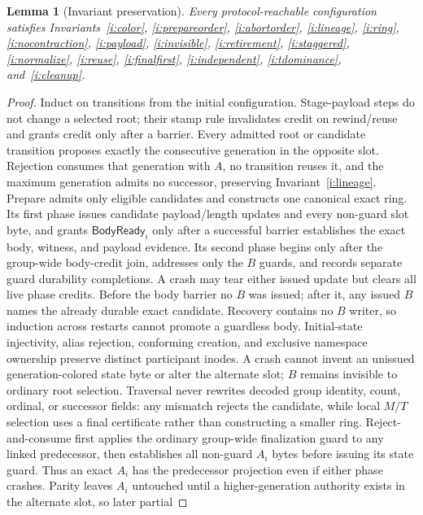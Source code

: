 \documentclass[10pt,twocolumn]{article}
\newtheorem{lemma}{Lemma}
\theoremstyle{remark}
\begin{document}
\begin{lemma}[Invariant preservation]\label{lem:preservation}
Every protocol-reachable configuration satisfies Invariants~\ref{i:color}, \ref{i:prepareorder}, \ref{i:abortorder},
  \ref{i:lineage}, \ref{i:ring}, \ref{i:nocontraction}, \ref{i:payload},
\ref{i:invisible}, \ref{i:retirement}, \ref{i:staggered}, \ref{i:normalize}, \ref{i:reuse},
\ref{i:finalfirst}, \ref{i:independent}, \ref{i:tdominance}, and~\ref{i:cleanup}.
\end{lemma}
\begin{proof}
Induct on transitions from the initial configuration. Stage-payload steps do not change a selected
root; their stamp rule invalidates credit on rewind/reuse and grants credit only after a barrier.
Every admitted root or candidate transition proposes exactly the consecutive generation in the
opposite slot. Rejection consumes that generation with $A$, no transition reuses it, and the maximum
generation admits no successor, preserving Invariant~\ref{i:lineage}.
Prepare admits only eligible candidates and constructs one canonical exact ring. Its first phase
issues candidate payload/length updates and every non-guard slot byte, and grants
$\mathsf{BodyReady}_i$ only after a successful barrier establishes the exact body, witness, and
payload evidence. Its second phase begins only after the group-wide body-credit join, addresses
only the $B$ guards, and records separate guard durability completions. A crash may tear either
issued update but clears all live phase credits. Before the body barrier no $B$ was issued; after it, any issued $B$ names the
already durable exact candidate. Recovery contains no $B$ writer, so induction across restarts
cannot promote a guardless body. Initial-state injectivity, alias rejection, conforming creation,
and exclusive namespace ownership preserve distinct participant inodes. A crash cannot invent an
unissued generation-colored state byte or alter the alternate slot; $B$ remains invisible to
ordinary root selection. Traversal never rewrites decoded group identity, count, ordinal, or
successor fields: any mismatch rejects the candidate, while local $M/T$ selection uses a final
certificate rather than constructing a smaller ring.
Reject-and-consume first applies the ordinary group-wide finalization guard to any linked
predecessor, then establishes all non-guard $A_i$ bytes before issuing its state guard. Thus an
exact $A_i$ has the predecessor projection even if either phase crashes. Parity leaves $A_i$
untouched until a higher-generation authority exists in the alternate slot, so later partial

\end{proof}
\end{document}
